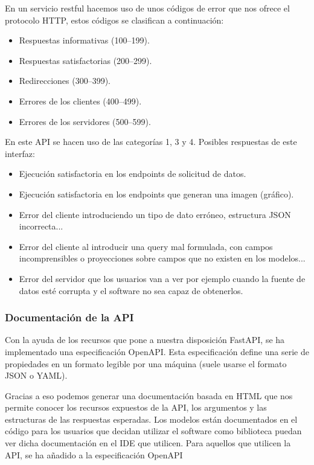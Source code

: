 En un servicio restful hacemos uso de unos códigos de error que nos ofrece el protocolo HTTP, estos códigos se clasifican a continuación:
\begin{itemize}
    \item Respuestas informativas (100–199).
    \item Respuestas satisfactorias (200–299).
    \item Redirecciones (300–399).
    \item Errores de los clientes (400–499).
    \item Errores de los servidores (500–599).
\end{itemize}

En este API se hacen uso de las categorías 1, 3 y 4. Posibles respuestas de este interfaz:
\begin{itemize}
    \item {} Ejecución satisfactoria en los endpoints de solicitud de datos.
    \item {} Ejecución satisfactoria en los endpoints que generan una imagen (gráfico).
    \item {} Error del cliente introduciendo un tipo de dato erróneo, estructura JSON incorrecta...
    \item {} Error del cliente al introducir una query mal formulada, con campos incomprensibles o proyecciones sobre campos que no existen en los modelos...
    \item {} Error del servidor que los usuarios van a ver por ejemplo cuando la fuente de datos esté corrupta y el software no sea capaz de obtenerlos.
\end{itemize}

\subsubsection{Documentación de la API}
Con la ayuda de los recursos que pone a nuestra disposición FastAPI, se ha implementado una especificación OpenAPI. Esta especificación define una serie de propiedades en un formato legible por una máquina (suele usarse el formato JSON o YAML).

Gracias a eso podemos generar una documentación basada en HTML que nos permite conocer los recursos expuestos de la API, los argumentos y las estructuras de las respuestas esperadas. Los modelos están documentados en el código para los usuarios que decidan utilizar el software como biblioteca puedan ver dicha documentación en el IDE que utilicen. Para aquellos que utilicen la API, se ha añadido a la especificación OpenAPI


